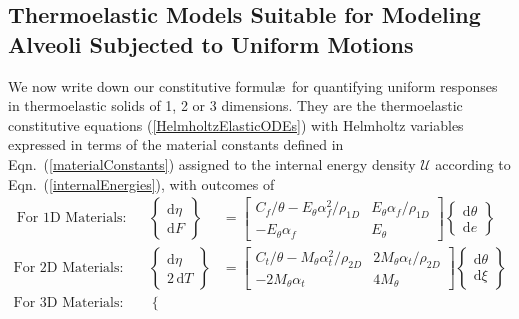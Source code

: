 \subsection{Thermoelastic Models Suitable for Modeling Alveoli Subjected to Uniform Motions}

We now write down our constitutive formul\ae\ for quantifying uniform responses in thermo\-elastic solids of 1, 2 or 3 dimensions.  They are the thermo\-elastic constitutive equations (\ref{HelmholtzElasticODEs}) with Helmholtz variables expressed in terms of the material constants defined in Eqn.~(\ref{materialConstants}) assigned to the internal energy density $\mathcal{U}$ according to Eqn.~(\ref{internalEnergies}), with outcomes of
\begin{subequations}
    \label{HelmholtzCEs}
    \begin{align}\
    \text{For 1D Materials:} & &
    \left\{ \begin{matrix}
    \mathrm{d} \eta \\ \mathrm{d} F
    \end{matrix} \right\} & = \begin{bmatrix}
    C_f / \theta - E_{\theta} \alpha_f^2 / \rho_{1D}& 
    E_{\theta} \alpha_f / \rho_{1D} \\
    -E_{\theta} \alpha_f & E_{\theta}
    \end{bmatrix} \left\{ \begin{matrix}
    \mathrm{d} \theta \\ \mathrm{d} e
    \end{matrix} \right\} \label{Helmholtz1D} \\
    \text{For 2D Materials:} & &
    \left\{ \begin{matrix}
    \mathrm{d} \eta \\ 2 \, \mathrm{d} T
    \end{matrix} \right\} & = \begin{bmatrix}
    C_t / \theta - M_{\theta} \alpha_t^2 / \rho_{2D} & 
    2 M_{\theta} \alpha_t / \rho_{2D} \\
    -2 M_{\theta} \alpha_t & 4 M_{\theta}
    \end{bmatrix} \left\{ \begin{matrix}
    \mathrm{d} \theta \\ \mathrm{d} \xi
    \end{matrix} \right\} \label{Helmholtz2D} \\
    \text{For 3D Materials:} & &
    \left\{ \begin{matrix}

\end{matrix}
\end{align}
\end{subequations}
